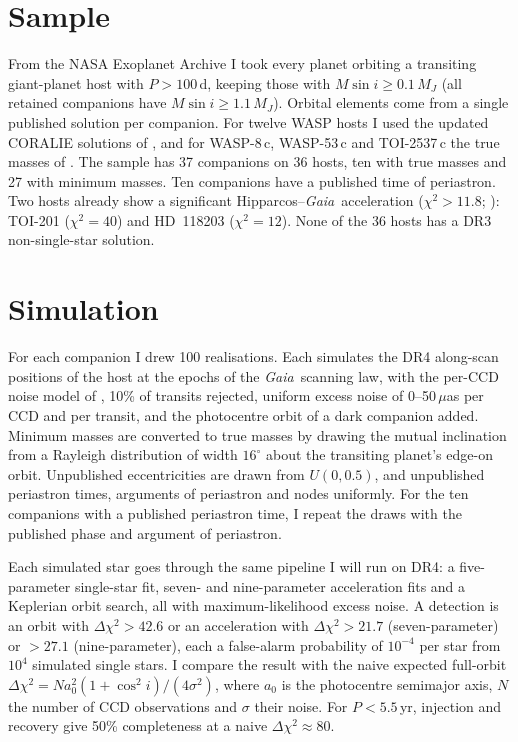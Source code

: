 \documentclass{aastex701}
\newcommand{\gaia}{\textit{Gaia}}
\begin{document}
\section{Sample}
From the NASA Exoplanet Archive I took every planet orbiting a transiting giant-planet host with
$P>100$\,d, keeping those with $M\sin i \geq 0.1\,M_J$ (all retained companions have
$M\sin i \geq 1.1\,M_J$). Orbital elements come from a single published solution per companion.
For twelve WASP hosts I used the updated CORALIE solutions of \citet{parc2026}, and for WASP-8\,c,
WASP-53\,c and TOI-2537\,c the true masses of \citet{xiao2026}. The sample has 37 companions on
36 hosts, ten with true masses and 27 with minimum masses. Ten companions have a published time
of periastron.
Two hosts already show a significant Hipparcos--\gaia\ acceleration ($\chi^2>11.8$;
\citealt{brandt2021}): TOI-201 ($\chi^2=40$) and HD~118203 ($\chi^2=12$). None of the 36 hosts
has a DR3 non-single-star solution.

\section{Simulation}
For each companion I drew 100 realisations. Each simulates the DR4 along-scan positions of the
host at the epochs of the \gaia\ scanning law, with the per-CCD noise model of \citet{holl2023},
10\% of transits rejected, uniform excess noise of 0--50\,$\mu$as per CCD and per transit, and
the photocentre orbit of a dark companion added. Minimum masses are converted to true masses by
drawing the mutual inclination from a Rayleigh distribution of width $16^\circ$
\citep{xiao2026} about the transiting planet's edge-on orbit. Unpublished eccentricities are
drawn from $U(0,0.5)$, and unpublished periastron times, arguments of periastron and nodes
uniformly. For the ten companions with a published periastron time, I repeat the draws with the
published phase and argument of periastron.

Each simulated star goes through the same pipeline I will run on DR4: a five-parameter
single-star fit, seven- and nine-parameter acceleration fits and a Keplerian orbit search, all
with maximum-likelihood excess noise. A detection is an orbit with $\Delta\chi^2>42.6$ or an
acceleration with $\Delta\chi^2>21.7$ (seven-parameter) or $>27.1$ (nine-parameter), each a
false-alarm probability of $10^{-4}$ per star from $10^4$ simulated single stars.
I compare the result with the naive expected full-orbit
$\Delta\chi^2 = N a_0^2 (1+\cos^2 i)/(4\sigma^2)$, where $a_0$ is the photocentre semimajor
axis, $N$ the number of CCD observations and $\sigma$ their noise. For $P<5.5$\,yr, injection
and recovery give 50\% completeness at a naive $\Delta\chi^2 \approx 80$.
\end{document}
